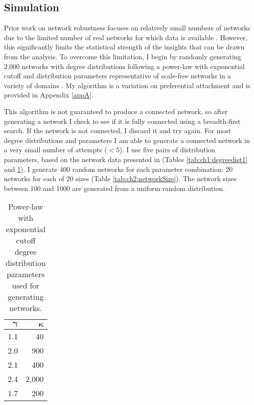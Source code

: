 
\subsection{Simulation}
\label{sec:ch2:methods:simulation}

Prior work on network robustness focuses on relatively small numbers of networks due to the limited number of real networks for which data is available \cite{Holme2002, Jeong2001, Albert2004, Crucitti2004a, Estrada2006, Montoya2006, Liu2011}. However, this significantly limits the statistical strength of the insights that can be drawn from the analysis. To overcome this limitation, I begin by randomly generating 2,000 networks with degree distributions following a power-law with exponential cutoff and distribution parameters representative of scale-free networks in a variety of domains \cite{Albert2002}. My algorithm is a variation on preferential attachment and is provided in Appendix \ref{appA}.

This algorithm is not guaranteed to produce a connected network, so after generating a network I check to see if it is fully connected using a breadth-first search. If the network is not connected, I discard it and try again. For most degree distributions and parameters I am able to generate a connected network in a very small number of attempts (\textbf{$<5$}).  I use five pairs of distribution parameters, based on the network data presented in \cite{Albert2002} (Tables \ref{tab:ch1:degreedist1} and \ref{tab:ch2:powerlawparams}).  I generate 400 random networks for each parameter combination: 20 networks for each of 20 sizes (Table \ref{tab:ch2:networkSize}). The network sizes between 100 and 1000 are generated from a uniform random distribution.


\begin{table}
\centering

\begin{tabular}{rr}
\toprule
$\mathbf{\gamma}$ & $\mathbf{\kappa}$\\
\midrule
1.1 & 40\\
2.0 & 900\\
2.1 & 400\\
2.4 & 2,000\\
1.7 & 200\\
\bottomrule

\end{tabular}

\caption{\label{tab:ch2:powerlawparams}Power-law with exponential cutoff degree distribution parameters used for generating networks.}
\end{table}

